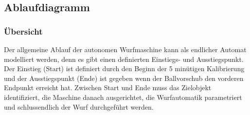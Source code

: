 \subsection{Ablaufdiagramm}
\label{ss_ablaufdiagramm}

\subsubsection{Übersicht}
Der allgemeine Ablauf der autonomen Wurfmaschine kann als endlicher Automat
modelliert werden, denn es gibt einen definierten Einstiegs- und 
Ausstiegspunkt. Der Einstieg (Start) ist definiert durch den Beginn der 5 minütigen Kalibrierung und der Ausstiegspunkt (Ende) ist gegeben wenn der Ballvorschub den vorderen Endpunkt erreicht hat. Zwischen Start und Ende muss das Zielobjekt
identifiziert, die Maschine danach ausgerichtet, die Wurfautomatik
parametriert und schlussendlich der Wurf durchgeführt werden.



